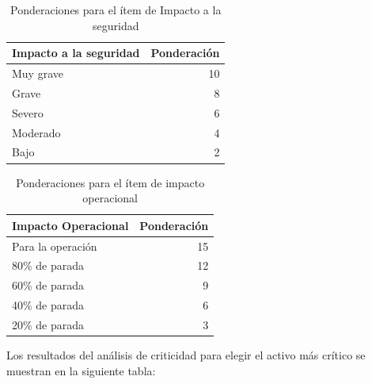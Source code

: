 \begin{table}[H]
  \centering
 
    \begin{tabular}{|l|r|}
    \hline
    Impacto a la seguridad & \multicolumn{1}{l|}{Ponderación} \\
    \hline
    Muy grave & 10 \\
    \hline
    Grave & 8 \\
    \hline
    Severo  & 6 \\
    \hline
    Moderado & 4 \\
    \hline
    Bajo  & 2 \\
    \hline
    \end{tabular}%
    \caption{Ponderaciones para el ítem de Impacto a la seguridad}
  \label{tab:addlabel}%
\end{table}%

\begin{table}[H]
  \centering
  
    \begin{tabular}{|l|r|}
    \hline
    Impacto Operacional & \multicolumn{1}{l|}{Ponderación } \\
    \hline
    Para la operación & 15 \\
    \hline
    80\% de parada & 12 \\
    \hline
    60\% de parada & 9 \\
    \hline
    40\% de parada & 6 \\
    \hline
    20\% de parada & 3 \\
    \hline
    \end{tabular}%
    \caption{Ponderaciones para el ítem de impacto operacional}
  \label{tab:addlabel}%
\end{table}%

Los resultados del análisis de criticidad para elegir el activo más crítico se muestran en la siguiente tabla:

\begin{table}[H]
  \centering
  
    \caption{Análisis de criticidad para determinar el activo más crítico.}
  \label{tab:addlabel}%
\end{table}%

